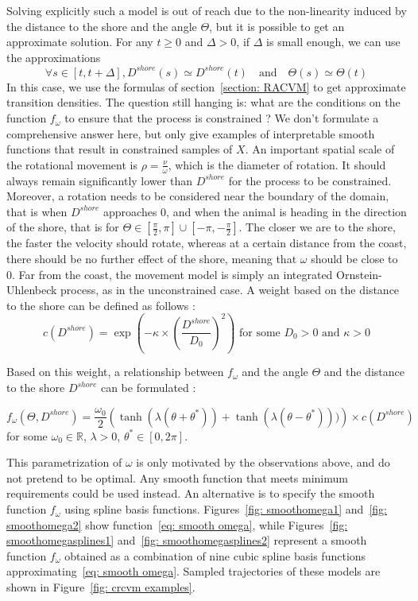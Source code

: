 \documentclass[11pt]{article}
\newcommand {\R}{\mathbb{R}}
\newcommand {\1}{\mathbb{1}}
\theoremstyle{definition}
\theoremstyle{remark}
\theoremstyle{remark}
\begin{document}
Solving explicitly such a model is out of reach due to the non-linearity induced by the distance to the shore and the angle $\Theta$, but it is possible to get an approximate solution.
For any $t \geq 0$ and $\Delta>0$, if $\Delta$ is small enough, we can use the approximations
\[\forall s \in [t,t+\Delta], D^{shore}(s) \simeq D^{shore}(t) \quad \mbox{and} \quad  \Theta(s)\simeq \Theta(t)\]
In this case, we use the formulas of section~\ref{section: RACVM} to get approximate transition densities.
The question still hanging is: what are the conditions on the function $f_{\omega}$ to ensure that the process is constrained ?
We don't formulate a comprehensive answer here, but only give examples of interpretable smooth functions that result in constrained samples of $X$.
An important spatial scale of the rotational movement is $\rho=\frac{\nu}{\omega}$, which is the diameter of rotation. It should always remain significantly lower than $D^{shore}$ for the process to be constrained. Moreover, a rotation needs to be considered near the boundary of the domain, that is when $D^{shore}$ approaches $0$, and when the animal is heading in the direction of the shore, that is for $\Theta \in \left[\frac{\pi}{2},\pi\right] \cup \left[-\pi,-\frac{\pi}{2}\right]$.
The closer we are to the shore, the faster the velocity should rotate,
whereas at a certain distance from the coast, there should be no further effect of the shore, meaning that $\omega$ should be close to $0$. Far from the coast, the movement model is simply an integrated Ornstein-Uhlenbeck process, as in the unconstrained case.
A weight based on the distance to the shore can be defined as follows :
\[c(D^{shore})=\exp\left(-\kappa \times \left(\frac{D^{shore}}{D_0}\right)^2\right)\mbox{ for some } D_0>0 \mbox{ and } \kappa>0\]

Based on this weight, a relationship between $f_{\omega}$ and the angle $\Theta$ and the distance to the shore $D^{shore}$ can be formulated  :

\begin{equation}
f_{\omega}(\Theta,D^{shore})=\frac{\omega_0}{2}\left(\tanh(\lambda(\theta+\theta^{*}))+\tanh(\lambda(\theta-\theta^{*})))\right)\times c(D^{shore})
\label{eq: smooth omega}
\end{equation}
for some $\omega_0 \in \R$, $\lambda>0$, $\theta^* \in [0,2\pi]$.

This parametrization of $\omega$ is only motivated by the observations above, and do not pretend to be optimal. Any smooth function that meets minimum requirements could be used instead. An alternative is to specify the smooth function $f_{\omega}$ using spline basis functions. Figures~\ref{fig: smoothomega1} and~\ref{fig: smoothomega2} show function~\eqref{eq: smooth omega}, while Figures~\ref{fig: smoothomegasplines1} and~\ref{fig: smoothomegasplines2}  represent a smooth function $f_{\omega}$ obtained as a combination of nine cubic spline basis functions approximating~\eqref{eq: smooth omega}. Sampled trajectories of these models are shown in Figure~\ref{fig: crcvm examples}.
\end{document}
